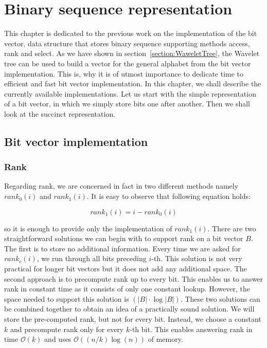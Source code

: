 \chapter{Binary sequence representation}
\label{kap:kap2}

This chapter is dedicated to the previous work on the implementation of the bit vector, data
structure that stores binary sequence supporting methods access, rank and select. As we have
shown in section~\ref{section:WaweletTree}, the Wavelet tree can be used to build a vector
for the general alphabet from the bit vector implementation. This is, why it is of utmost
importance to dedicate time to efficient and fast bit vector implementation. In this
chapter, we shall describe the currently available implementations. Let us start with
the simple representation of a bit vector, in which we simply store bits one after another.
Then we shall look at the succinct representation.

\section{Bit vector implementation}

\subsection{Rank}
\label{section:rank}

Regarding rank, we are concerned in fact in two different methods namely $rank_0(i)$ and
$rank_1(i)$. It is easy to observe that following equation holds:

                    $$rank_1(i) = i - rank_0(i)$$

so it is enough to provide only the implementation of $rank_1(i)$.
There are two straightforward solutions we can begin with to support rank on a bit vector
$B$. The first is to store no additional information. Every time we are asked
for $rank_c(i)$, we run through all bits preceding $i$-th. This solution is not very
practical for longer bit vectors but it does not add any additional space. The second
approach is to precompute rank up to every bit. This enables us to answer rank in constant
time as it consists of only one constant lookup. However, the space needed to support this
solution is $(|B|\cdot\log |B|)$. These two solutions can be combined together to obtain an
idea of a practically sound solution. We will store the pre-computed rank, but not for every
bit. Instead, we choose a constant $k$ and precompute rank only for every $k$-th bit. This
enables answering rank in time $\mathcal{O}(k)$ and uses $\mathcal{O}((n/k)\log(n))$ of memory.

